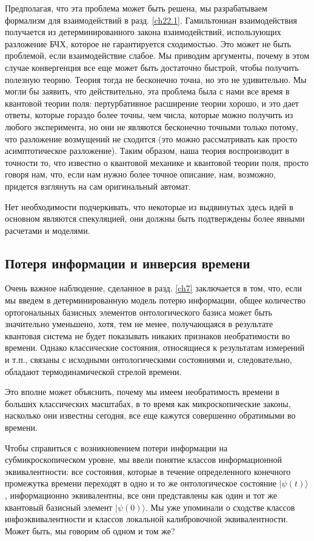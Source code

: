 \documentclass[main.tex]{subfiles}
\begin{document}
Предполагая, что эта проблема может быть решена, мы разрабатываем формализм для взаимодействий в разд. \ref{ch22.1}. Гамильтониан взаимодействия получается из детерминированного закона взаимодействий, использующих разложение БЧХ, которое не гарантируется сходимостью. Это может не быть проблемой, если взаимодействие слабое. Мы приводим аргументы, почему в этом случае конвергенция все еще может быть достаточно быстрой, чтобы получить полезную теорию. Теория тогда не бесконечно точна, но это не удивительно. Мы могли бы заявить, что действительно, эта проблема была с нами все время в квантовой теории поля: пертурбативное расширение теории хорошо, и это дает ответы, которые гораздо более точны, чем числа, которые можно получить из любого эксперимента, но они не являются бесконечно точными только потому, что разложение возмущений не сходится (это можно рассматривать как просто асимптотическое разложение). Таким образом, наша теория воспроизводит в точности то, что известно о квантовой механике и квантовой теории поля, просто говоря нам, что, если нам нужно более точное описание, нам, возможно, придется взглянуть на сам оригинальный автомат.

Нет необходимости подчеркивать, что некоторые из выдвинутых здесь идей в основном являются спекуляцией, они должны быть подтверждены более явными расчетами и моделями.

\subsection{Потеря информации и инверсия времени}\label{ch9.3}

Очень важное наблюдение, сделанное в разд. \ref{ch7} заключается в том, что, если мы введем в детерминированную модель потерю информации, общее количество ортогональных базисных элементов онтологического базиса может быть значительно уменьшено, хотя, тем не менее, получающаяся в результате квантовая система не будет показывать никаких признаков необратимости во времени. Однако классические состояния, относящиеся к результатам измерений и т.п., связаны с исходными онтологическими состояниями и, следовательно, обладают термодинамической стрелой времени.

Это вполне может объяснить, почему мы имеем необратимость времени в больших классических масштабах, в то время как микроскопические законы, насколько они известны сегодня, все еще кажутся совершенно обратимыми во времени.

Чтобы справиться с возникновением потери информации на субмикроскопическом уровне, мы ввели понятие классов информационной эквивалентности: все состояния, которые в течение определенного конечного промежутка времени переходят в одно и то же онтологическое состояние $\mid \psi(t) \rangle$, информационно эквивалентны, все они представлены как один и тот же квантовый базисный элемент $\mid \psi(0) \rangle$. Мы уже упоминали о сходстве классов инфоэквивалентности и классов локальной калибровочной эквивалентности. Может быть, мы говорим об одном и том же?
\end{document}
